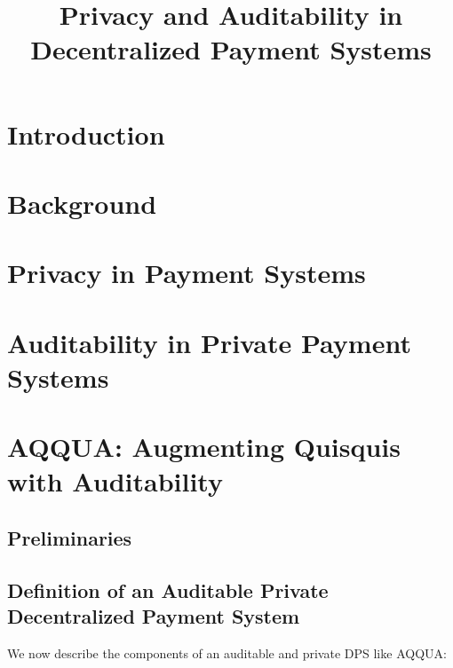\documentclass[a4paper, thm-restate]{book}
\title{Privacy and Auditability in Decentralized Payment Systems}
\begin{document}
    
    \sle
    
    

    \tableofcontents
    
    

    \chapter{Introduction}
        

    \chapter{Background}
        
        
    
    \chapter{Privacy in Payment Systems}
        
        

    \chapter{Auditability in Private Payment Systems}
    
    

    \chapter{AQQUA: Augmenting Quisquis with Auditability}
        
        \section{Preliminaries}
        
        
        \section{Definition of an Auditable Private Decentralized Payment System}
        We now describe the components of an auditable and private DPS like AQQUA:

        
        
        
        
        
        
\end{document}
